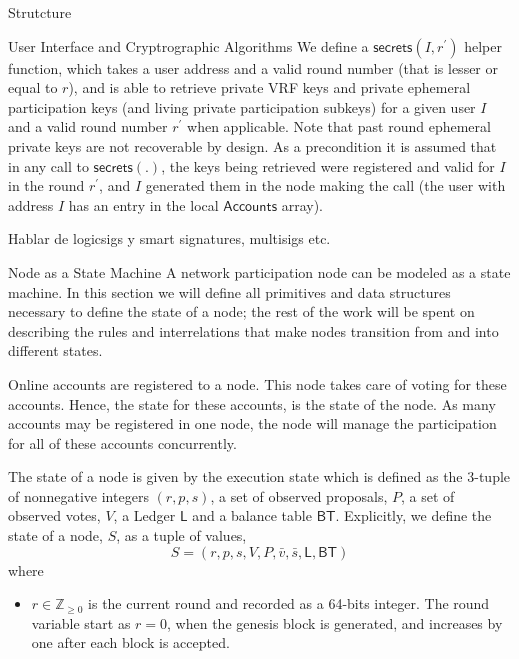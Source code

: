 \documentclass[10pt,a4paper]{article}
\begin{document}
\begin{section}{Strutcture}
\begin{subsection}{User Interface and Cryptrographic Algorithms}
    We define a $\mathsf{secrets}(I, r^\prime)$ helper function, which takes a user address and
    a valid round number (that is lesser or equal to $r$), and is able to retrieve private VRF keys
    and private ephemeral participation keys (and living private participation subkeys) for a given user $I$ 
    and a valid round number $r^\prime$ when applicable. Note that past round ephemeral private keys are not recoverable
    by design. 
    As a precondition it is assumed that in any call to $\mathsf{secrets(.)}$,
    the keys being retrieved were registered and valid for $I$ in the round $r^\prime$, and $I$ generated them
    in the node making the call (the user with address $I$ has an entry in the local $\mathsf{Accounts}$ array).


    Hablar de logicsigs y smart signatures, multisigs etc.

\end{subsection}
\begin{subsection}{Node as a State Machine}
A network participation node can be modeled as a state machine.
In this section we will define all primitives and data structures necessary to define the state
of a node; the rest of the work will be spent on describing the rules and interrelations that
make nodes transition from and into different states.

Online accounts are registered to a node. This node takes care of voting for these accounts.
Hence, the state for these accounts, is the state of the node. As many accounts may be 
registered in one node, the node will manage the participation for all of these accounts 
concurrently.

The {\sf state of a node} 
is given by the {\sf execution state} which is defined as the 3-tuple of nonnegative integers $(r, p, s)$, 
a set of observed proposals, $P$, 
a set of observed votes, $V$, 
a Ledger $\mathsf{L}$ and 
a balance table $\mathsf{BT}$.
Explicitly, we define the state of a node, $S$, as a tuple of values, 
$$
S = (r, p, s, V, P, \bar{v}, \bar{s}, \mathsf{L}, \mathsf{BT})
$$ 
where
\begin{itemize}
    \item 
    $r\in\mathbb{Z}_{\ge 0}$ is the current {\sf round} and recorded as a 64-bits integer. 
    The round variable start as $r=0$, when the genesis block is generated, and increases
    by one after each block is accepted.
    

\end{itemize}
\end{subsection}
\end{section}
\end{document}
